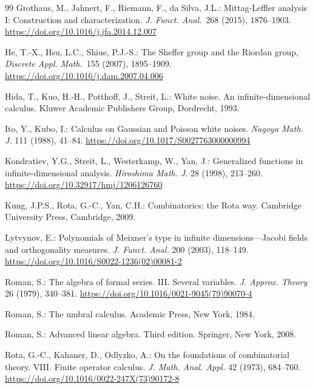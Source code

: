 \documentclass[12pt]{article}
\theoremstyle{remark}
\theoremstyle{remark}
\theoremstyle{remark}
\begin{document}
\begin{thebibliography}{99}
 Grothaus, M., Jahnert, F., Riemann, F., da Silva, J.L.: Mittag-Leffler analysis I: Construction and characterization. {\it J. Funct. Anal.}\ 268 (2015), 1876--1903. 
\href{https://doi.org/10.1016/j.jfa.2014.12.007}{https://doi.org/10.1016/j.jfa.2014.12.007}


 He,  T.-X., Hsu,  L.C.,  Shiue, P.J.-S.: The Sheffer group and the Riordan group, {\it Discrete Appl. Math.}\ 155 (2007), 1895--1909.\newline
 \href{https://doi.org/10.1016/j.dam.2007.04.006}{https://doi.org/10.1016/j.dam.2007.04.006}


  Hida, T., Kuo, H.-H., Potthoff, J., Streit, L.: White noise. An infinite-dimensional calculus.   Kluwer Academic Publishers Group, Dordrecht, 1993. 

 Ito, Y., Kubo, I.: Calculus on Gaussian and Poisson white noises. {\it Nagoya Math. J.} 111 (1988), 41--84. \href{https://doi.org/10.1017/S0027763000000994}{https://doi.org/10.1017/S0027763000000994} 

  Kondratiev, Y.G.,  Streit, L., Westerkamp, W.,  Yan, J.:  Generalized functions in infinite-dimensional analysis. {\it Hiroshima Math. J}. 28 (1998),  213--260. \newline
\href{https://doi.org/10.32917/hmj/1206126760}{https://doi.org/10.32917/hmj/1206126760}  

  Kung, J.P.S.,  Rota, G.-C., Yan, C.H.: Combinatorics: the Rota way.
 Cambridge University Press, Cambridge, 2009. 

  Lytvynov, E.: Polynomials of Meixner's type in infinite dimensions---Jacobi fields and orthogonality measures. {\it J. Funct. Anal.} 200 (2003), 118--149. \linebreak\href{https://doi.org/10.1016/S0022-1236(02)00081-2}{https://doi.org/10.1016/S0022-1236(02)00081-2} 

 Roman, S.: The algebra of formal series. III. Several variables. {\it J. Approx. Theory} 26 (1979), 340--381.
\href{https://doi.org/10.1016/0021-9045(79)90070-4}{https://doi.org/10.1016/0021-9045(79)90070-4} 


 Roman, S.: The umbral calculus. Academic Press, New York, 1984. 

 Roman, S.: Advanced linear algebra. Third edition. Springer, New York, 2008. 

  Rota, G.-C.,  Kahaner, D.,  Odlyzko, A.: On the foundations of combinatorial theory. VIII. Finite operator calculus. {\it J. Math. Anal. Appl.} 42 (1973), 684--760. \href{https://doi.org/10.1016/0022-247X(73)90172-8}{https://doi.org/10.1016/0022-247X(73)90172-8} 



\end{thebibliography}
\end{document}
